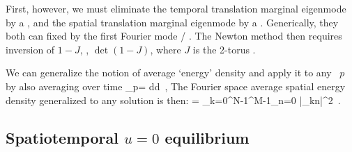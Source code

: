First, however, we must eliminate the temporal translation marginal eigenmode
by a {\PoincSec}, and the spatial translation marginal eigenmode by a {\slice}.
Generically, they both can fixed by the first Fourier mode {\PoincSec} /
{\slice}.
The Newton method then requires inversion of $1-J$, \ie,
$\det(1-J)$, where $J$ is the 2-torus \jacobianM.

We can generalize the notion of average `energy' density
 and apply it to any \twot\ $p$ by also
averaging over time
\beq
    \expctE_p=
  \!\oint d\pSpace\oint d\zeit {}
  \,,
  \label{twotEnergy}
\eeq
The Fourier space average spatial energy density 
generalized to any {\spt} solution  is then:
\beq
\expctE
          =  \sum_{k=0}^{N-1}\sum^{M-1}_{n=0}
             {\textstyle{}}|\Fu_{kn}|^2
\,.


\subsection{Spatiotemporal $u=0$ equilibrium}
\label{sect:KSu0equiST}

